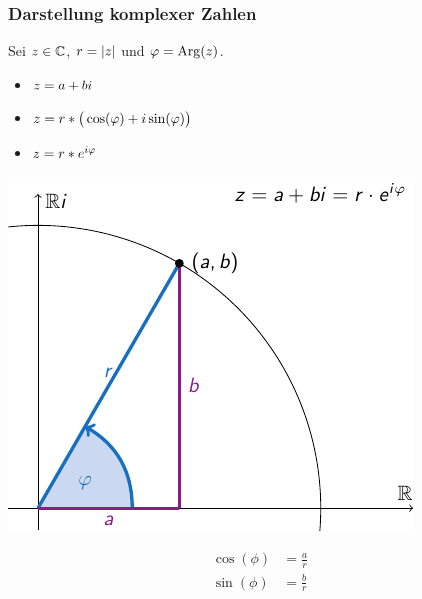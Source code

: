 \documentclass{beamer}
\begin{document}
\begin{frame} \frametitle{Darstellung komplexer Zahlen}
	

		Sei $z \in \mathbb{C}$, $r = \left| z \right|$ und $\varphi = \operatorname{Arg}(z)$.
		\begin{itemize}
			\item $z = a + b i$
			\item $z = r * \big( \cos(\varphi) + i \sin(\varphi) \big)$
			\item $z = r * e^{i \varphi}$
		\end{itemize}
\begin{minipage}{\dimexpr0.6\linewidth-\fboxrule-\fboxsep}
	\includegraphics[width=\textwidth]{complex-plane}
\end{minipage}
\begin{minipage}{\dimexpr0.4\linewidth-\fboxrule-\fboxsep}
	\begin{align*}
		\cos(\phi) &= \frac{a}{r} \\
		\sin(\phi) &= \frac{b}{r}
	\end{align*}
\end{minipage}
	
\end{frame}
\end{document}
